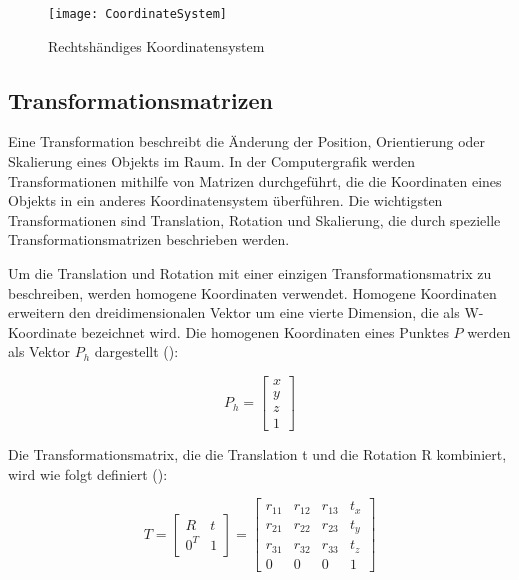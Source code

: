 \begin{figure}
    \centering
    \texttt{[image: CoordinateSystem]}
    \caption{Rechtshändiges Koordinatensystem \cite{noakes2013coordinateSystem}\label{fig:Koordinatensystem}}\par
\end{figure}

\subsection{Transformationsmatrizen}

Eine Transformation beschreibt die Änderung der Position, Orientierung oder Skalierung eines Objekts im Raum. In der Computergrafik werden Transformationen mithilfe von Matrizen durchgeführt, die die Koordinaten eines Objekts in ein anderes Koordinatensystem überführen. Die wichtigsten Transformationen sind Translation, Rotation und Skalierung, die durch spezielle Transformationsmatrizen beschrieben werden. \cite{doerner2022virtual, gao2021vSLAM, pezzi2021matrices}

Um die Translation und Rotation mit einer einzigen Transformationsmatrix zu beschreiben, werden homogene Koordinaten verwendet. Homogene Koordinaten erweitern den dreidimensionalen Vektor um eine vierte Dimension, die als W-Koordinate bezeichnet wird. Die homogenen Koordinaten eines Punktes \(P\) werden als Vektor \(P_h\) dargestellt (\cite{doerner2022virtual, gao2021vSLAM, freescale2010math3d}):

\begin{equation}
P_h = \begin{bmatrix} x \\ y \\ z \\ 1 \end{bmatrix}
\end{equation}

Die Transformationsmatrix, die die Translation t und die Rotation R kombiniert, wird wie folgt definiert (\cite{doerner2022virtual, gao2021vSLAM, freescale2010math3d}):

\begin{equation}
T = \begin{bmatrix} R & t \\ 0^T & 1 \end{bmatrix} = 
\begin{bmatrix} 
    r_{11} & r_{12} & r_{13} & t_x \\ 
    r_{21} & r_{22} & r_{23} & t_y \\ 
    r_{31} & r_{32} & r_{33} & t_z \\ 
    0 & 0 & 0 & 1 
\end{bmatrix}
\end{equation}

